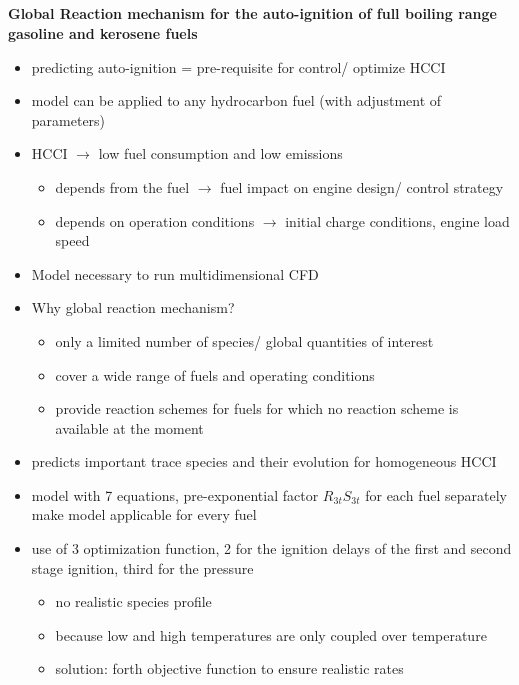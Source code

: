 \documentclass[12pt,oneside,a4paper,english]{article}
\begin{document}
\subsection{\cite{vandersickel2013}} %
\textbf{Global Reaction mechanism for the auto-ignition of full boiling range gasoline and kerosene fuels}

\begin{itemize}
\item{predicting auto-ignition = pre-requisite for control/ optimize HCCI}
\item{model can be applied to any hydrocarbon fuel (with adjustment of parameters)}
\item{HCCI $\rightarrow$ low fuel consumption and low emissions}

	\begin{itemize}
	\item{depends from the fuel $\rightarrow$ fuel impact on engine design/ control strategy}
	\item{depends on operation conditions $\rightarrow$ initial charge conditions, engine load speed}
	\end{itemize}

\item{Model necessary to run multidimensional CFD}
\item{Why global reaction mechanism?}
	
	\begin{itemize}
	\item{only a limited number of species/ global quantities of interest}
	\item{cover a wide range of fuels and operating conditions}
	\item{provide reaction schemes for fuels for which no reaction scheme is available at the moment}
	\end{itemize}
	

\item{predicts important trace species and their evolution for homogeneous HCCI}
\item{model with 7 equations, pre-exponential factor $R_{3t}S_{3t}$ for each fuel separately make model applicable for every fuel} 
\item{use of 3 optimization function, 2 for the ignition delays of the first and second stage ignition, third for the pressure}

	\begin{itemize}
	\item{no realistic species profile}
	\item{because low and high temperatures are only coupled over temperature}
	\item{solution: forth objective function to ensure realistic rates}
	\end{itemize}


\end{itemize}
\end{document}

